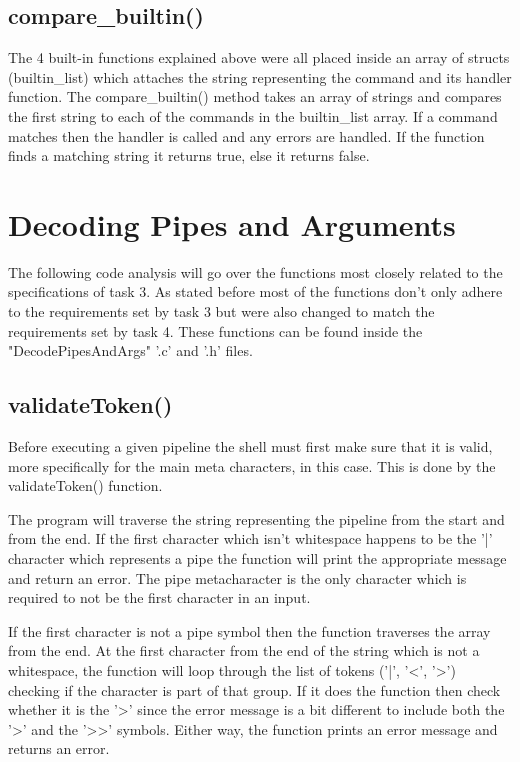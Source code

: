 \documentclass[12pt, a4paper]{report}
\begin{document}
\section{compare\_builtin()}
The 4 built-in functions explained above were all placed inside an array of structs (builtin\_list) which attaches the string representing the command and its handler function. The compare\_builtin() method takes an array of strings and compares the first string to each of the commands in the builtin\_list array. If a command matches then the handler is called and any errors are handled. If the function finds a matching string it returns true, else it returns false.


\chapter{Decoding Pipes and Arguments}
The following code analysis will go over the functions most closely related to the specifications of task 3. As stated before most of the functions don't only adhere to the requirements set by task 3 but were also changed to match the requirements set by task 4. These functions can be found inside the "DecodePipesAndArgs" '.c' and '.h' files.

\section{validateToken()}
Before executing a given pipeline the shell must first make sure that it is valid, more specifically for the main meta characters, in this case. This is done by the validateToken() function. 

The program will traverse the string representing the pipeline from the start and from the end. If the first character which isn't whitespace happens to be the '|' character which represents a pipe the function will print the appropriate message and return an error. The pipe metacharacter is the only character which is required to not be the first character in an input.

If the first character is not a pipe symbol then the function traverses the array from the end. At the first character from the end of the string which is not a whitespace, the function will loop through the list of tokens ('|', '<', '>') checking if the character is part of that group. If it does the function then check whether it is the '>' since the error message is a bit different to include both the '>' and the '>>' symbols. Either way, the function prints an error message and returns an error.
\end{document}
